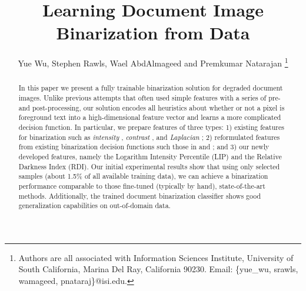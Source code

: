 \documentclass[onecolumn,11pt,draftcls,journal]{IEEEtran}
\begin{document}



\title{Learning Document Image Binarization from Data}
\author{ {Yue Wu, Stephen Rawls, Wael AbdAlmageed and Premkumar Natarajan}
\thanks{ Authors are all associated with Information Sciences Institute, 
University of South California, Marina Del Ray, California 90230. Email: \{yue\_wu, srawls, wamageed, pnataraj\}@isi.edu.}}















\maketitle

\setlength{\intextsep}{3pt} %
\setlength{\textfloatsep}{3pt}
\setlength{\abovecaptionskip}{3pt}
\setlength{\belowcaptionskip}{1pt}
\setlength{\dbltextfloatsep}{1pt}

\begin{abstract}
In this paper we present a fully trainable binarization solution for degraded document images. Unlike previous attempts that often used simple features with a series of pre- and post-processing, our solution encodes all heuristics about whether or not a pixel is foreground text into a high-dimensional feature vector and learns a more complicated decision function. In particular, we prepare features of three types: 1) existing features for binarization such as \textit{intensity}  \cite{Otsu1975}, \textit{contrast} \cite{Su2009,Su2013}, and \textit{Laplacian} \cite{Howe2011,Howe2013}; 2) reformulated features from existing binarization decision functions such those in \cite{Niblack1986} and \cite{Sauvola2000}; and 3) our newly developed features, namely the Logarithm Intensity Percentile (LIP) and the Relative Darkness Index (RDI). Our initial experimental results show that using only selected samples (about 1.5\% of all available training data), we can achieve a binarization performance comparable to those fine-tuned (typically by hand), state-of-the-art methods. Additionally, the trained document binarization classifier shows good generalization capabilities on out-of-domain data.
\end{abstract}
\end{document}
